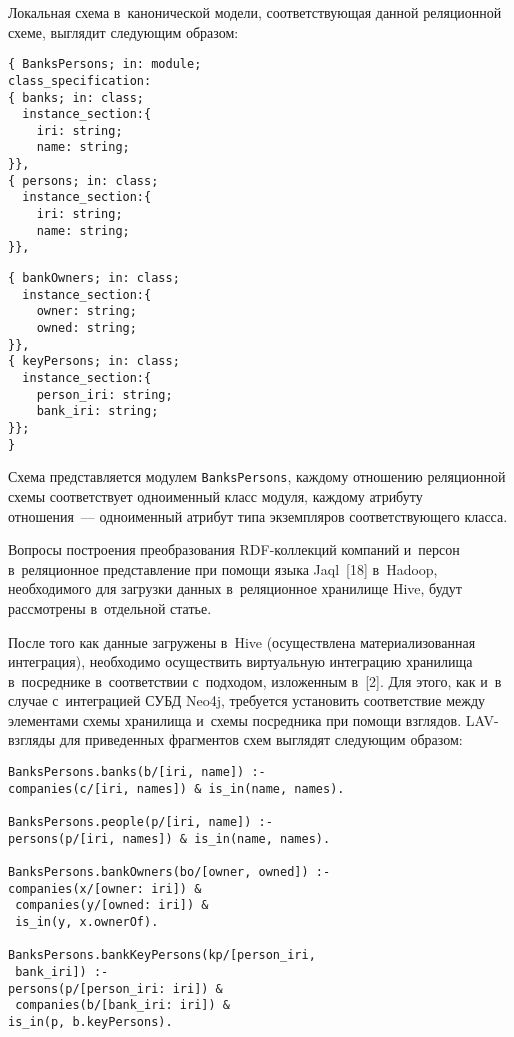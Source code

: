\begin{multicols}{2}
      Локальная схема в~канонической модели, соответствующая данной 
реляционной схеме, выглядит следующим образом:
      \begin{verbatim}
{ BanksPersons; in: module;
class_specification:
{ banks; in: class;
  instance_section:{
    iri: string;
    name: string;
}},
{ persons; in: class;
  instance_section:{
    iri: string;
    name: string;
}},
\end{verbatim}



\noindent
\begin{verbatim}
{ bankOwners; in: class;
  instance_section:{
    owner: string;
    owned: string;
}},
{ keyPersons; in: class;
  instance_section:{
    person_iri: string;
    bank_iri: string;
}};
}
\end{verbatim}



      Схема представляется модулем \verb"BanksPersons", каждому 
отношению реляционной схемы соответствует одноименный класс модуля, 
каждому атрибуту отношения~--- одноименный атрибут типа экземпляров 
соответствующего класса.
      
      Вопросы построения преобразования RDF-кол\-лек\-ций компаний 
и~персон в~реляционное представление при помощи языка Jaql~[18] в~Hadoop, 
необходимого для загрузки данных в~реляционное хранилище Hive, будут 
рассмотрены в~отдельной статье.
      
      После того как данные загружены в~Hive (осуществлена 
материализованная интеграция), необходимо осуществить виртуальную 
интеграцию хранилища в~посреднике в~соответствии с~подходом, изложенным 
в~[2]. Для этого, как и~в случае с~интеграцией СУБД Neo4j, требуется 
установить соответствие между элементами схемы хранилища и~схемы 
посредника при помощи взглядов. LAV-взгля\-ды для приведенных фрагментов 
схем выглядят следующим образом:
{\small      \begin{verbatim}
BanksPersons.banks(b/[iri, name]) :- 
companies(c/[iri, names]) & is_in(name, names).

BanksPersons.people(p/[iri, name]) :- 
persons(p/[iri, names]) & is_in(name, names).

BanksPersons.bankOwners(bo/[owner, owned]) :- 
companies(x/[owner: iri]) & 
 companies(y/[owned: iri]) & 
 is_in(y, x.ownerOf).

BanksPersons.bankKeyPersons(kp/[person_iri,
 bank_iri]) :- 
persons(p/[person_iri: iri]) &
 companies(b/[bank_iri: iri]) & 
is_in(p, b.keyPersons).
\end{verbatim}
}


\end{multicols}
